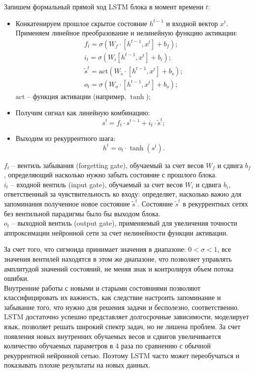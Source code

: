 \bigskip\par
Запишем формальный прямой ход LSTM блока в момент времени $t$:
\begin{itemize}
    \item Конкатенируем прошлое скрытое состояние $h^{t-1}$ и входной вектор $x^{t}$. Применяем линейное преобразование и нелинейную функцию активации:
    \begin{gather*}
        f_{t} = \sigma\left(W_{f}\cdot \left[h^{t-1}, x^{t}\right] + b_{f}\right);\\
        i_{t} = \sigma \left(W_{i}\left[h^{t-1}, x^{t}\right] + b_{i}\right);\\
        \tilde{s}^{t} = \mathrm{act}\left(W_{\tilde{s}}\cdot \left[h^{t-1}, x^{t}\right] + b_{\tilde{s}}\right);\\
        o_{t} = \sigma \left(W_{o} \cdot \left[h^{t-1}, x^{t}\right] + b_{o}\right);
    \end{gather*}
    $\mathrm{act}$ -- функция активации (например, $\tanh$);
    \item Получим сигнал как линейную комбинацию:
    \[s^{t} = f_{t} \cdot s^{t-1} + i_{t} \cdot \tilde{s}^{t};\]
    \item Выходим из рекуррентного шага:
    \[h^{t} = o_{t}\cdot \tanh (s^{t}).\]
\end{itemize}
$f_{t}$ -- вентиль забывания (forgetting gate), обучаемый за счет весов $W_{f}$ и сдвига $b_{f}$, определяющий насколько нужно забыть состояние с прошлого блока.\\
$i_{t}$ -- входной вентиль (input gate), обучаемый за счет весов $W_{i}$ и сдвига $b_{i}$, ответственный за чувствительность ко входу: определяет, насколько важно для запоминания полученное новое состояние $\tilde{s}^{t}$. Состояние $\tilde{s}^{t}$ в рекуррентных сетях без вентильной парадигмы было бы выходом блока.\\
$o_{t}$ -- выходной вентиль (output gate), применяемый для увеличения точности аппроксимации нейронной сети за счет нелинейности функции активации.

\bigskip\par
За счет того, что сигмоида принимает значения в диапазоне: $0 < \sigma < 1$, все значения вентилей находятся в этом же диапазоне, что позволяет управлять амплитудой значений состояний, не меняя знак и контролируя объем потока ошибки. \\
Внутренние работы с новыми и старыми состояниями позволяют классифицировать их важность, как следствие настроить запоминание и забывание того, что нужно для решения задачи и бесполезно, соответственно. LSTM достаточно успешно представляет долгосрочные зависимости, моделирует язык, позволяет решать широкий спектр задач, но не лишена проблем. За счет появления новых внутренних обучаемых весов и сдвигов увеличивается количество обучаемых параметров в 4 раза по сравнению с обычной рекуррентной нейронной сетью. Поэтому LSTM часто может переобучаться и показывать плохие результаты на новых данных.
